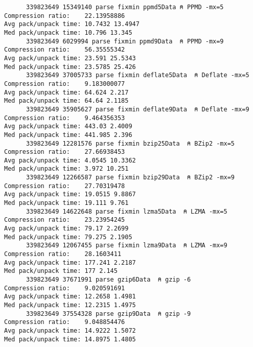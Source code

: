 \begin{verbatim}
      339823649 15349140 parse fixmin ppmd5Data ⍝ PPMD -mx=5
Compression ratio:    22.13958886
Avg pack/unpack time: 10.7432 13.4947
Med pack/unpack time: 10.796 13.345
      339823649 6029994 parse fixmin ppmd9Data  ⍝ PPMD -mx=9
Compression ratio:    56.35555342
Avg pack/unpack time: 23.591 25.5343
Med pack/unpack time: 23.5785 25.426
      339823649 37005733 parse fixmin deflate5Data  ⍝ Deflate -mx=5
Compression ratio:    9.183000077
Avg pack/unpack time: 64.624 2.217
Med pack/unpack time: 64.64 2.1185
      339823649 35905627 parse fixmin deflate9Data  ⍝ Deflate -mx=9
Compression ratio:    9.464356353
Avg pack/unpack time: 443.03 2.4009
Med pack/unpack time: 441.985 2.396
      339823649 12281576 parse fixmin bzip25Data  ⍝ BZip2 -mx=5
Compression ratio:    27.66938453
Avg pack/unpack time: 4.0545 10.3362
Med pack/unpack time: 3.972 10.251
      339823649 12266587 parse fixmin bzip29Data  ⍝ BZip2 -mx=9
Compression ratio:    27.70319478
Avg pack/unpack time: 19.0515 9.8867
Med pack/unpack time: 19.111 9.761
      339823649 14622648 parse fixmin lzma5Data  ⍝ LZMA -mx=5
Compression ratio:    23.23954245
Avg pack/unpack time: 79.17 2.2699
Med pack/unpack time: 79.275 2.1905
      339823649 12067455 parse fixmin lzma9Data  ⍝ LZMA -mx=9
Compression ratio:    28.1603411
Avg pack/unpack time: 177.241 2.2187
Med pack/unpack time: 177 2.145
      339823649 37671991 parse gzip6Data  ⍝ gzip -6
Compression ratio:    9.020591691
Avg pack/unpack time: 12.2658 1.4981
Med pack/unpack time: 12.2315 1.4975
      339823649 37554328 parse gzip9Data  ⍝ gzip -9
Compression ratio:    9.048854476
Avg pack/unpack time: 14.9222 1.5072
Med pack/unpack time: 14.8975 1.4805
\end{verbatim}

